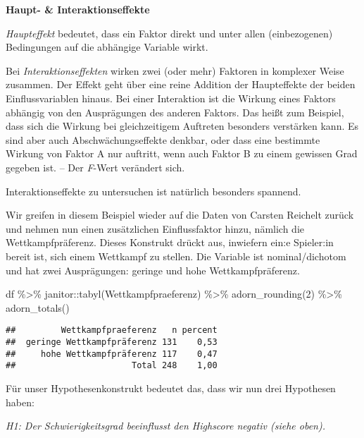 \documentclass[
]{book}
\newenvironment{Shaded}{\begin{snugshade}}{\end{snugshade}}
\newcommand{\DecValTok}[1]{\textcolor[rgb]{0.00,0.00,0.81}{#1}}
\newcommand{\FunctionTok}[1]{\textcolor[rgb]{0.00,0.00,0.00}{#1}}
\newcommand{\NormalTok}[1]{#1}
\newcommand{\SpecialCharTok}[1]{\textcolor[rgb]{0.00,0.00,0.00}{#1}}
\begin{document}
\leavevmode\hypertarget{info_interactionanova}{}%
\textbf{Haupt- \& Interaktionseffekte}

\emph{Haupteffekt} bedeutet, dass ein Faktor direkt und unter allen (einbezogenen) Bedingungen auf die abhängige Variable wirkt.

Bei \emph{Interaktionseffekten} wirken zwei (oder mehr) Faktoren in komplexer Weise zusammen. Der Effekt geht über eine reine Addition der Haupteffekte der beiden Einflussvariablen hinaus. Bei einer Interaktion ist die Wirkung eines Faktors abhängig von den Ausprägungen des anderen Faktors. Das heißt zum Beispiel, dass sich die Wirkung bei gleichzeitigem Auftreten besonders verstärken kann. Es sind aber auch Abschwächungseffekte denkbar, oder dass eine bestimmte Wirkung von Faktor A nur auftritt, wenn auch Faktor B zu einem gewissen Grad gegeben ist. -- Der \emph{F}-Wert verändert sich.

Interaktionseffekte zu untersuchen ist natürlich besonders spannend.

Wir greifen in diesem Beispiel wieder auf die Daten von Carsten Reichelt zurück und nehmen nun einen zusätzlichen Einflussfaktor hinzu, nämlich die Wettkampfpräferenz. Dieses Konstrukt drückt aus, inwiefern ein:e Spieler:in bereit ist, sich einem Wettkampf zu stellen. Die Variable ist nominal/dichotom und hat zwei Ausprägungen: geringe und hohe Wettkampfpräferenz.

\begin{Shaded}
\begin{Highlighting}[]
\NormalTok{df }\SpecialCharTok{\%\textgreater{}\%} 
\NormalTok{  janitor}\SpecialCharTok{::}\FunctionTok{tabyl}\NormalTok{(Wettkampfpraeferenz) }\SpecialCharTok{\%\textgreater{}\%} 
  \FunctionTok{adorn\_rounding}\NormalTok{(}\DecValTok{2}\NormalTok{) }\SpecialCharTok{\%\textgreater{}\%} 
  \FunctionTok{adorn\_totals}\NormalTok{() }
\end{Highlighting}
\end{Shaded}

\begin{verbatim}
##         Wettkampfpraeferenz   n percent
##  geringe Wettkampfpräferenz 131    0,53
##     hohe Wettkampfpräferenz 117    0,47
##                       Total 248    1,00
\end{verbatim}

Für unser Hypothesenkonstrukt bedeutet das, dass wir nun drei Hypothesen haben:

\emph{H1: Der Schwierigkeitsgrad beeinflusst den Highscore negativ (siehe oben).}
\end{document}
